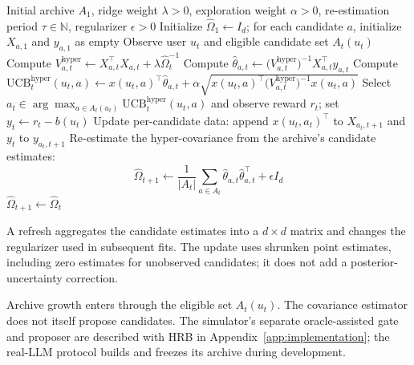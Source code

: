 \documentclass{article} %
\begin{document}
\begin{algorithm}[t]
\caption{HyperRidge-Periodic (HRP): routing with periodic covariance updates}
\label{alg:hyper-ridge}
\begin{algorithmic}[1]
\Require Initial archive $A_1$, ridge weight $\lambda > 0$, exploration
  weight $\alpha > 0$, re-estimation period $\tau \in \mathbb{N}$,
  regularizer $\epsilon > 0$
\State Initialize $\widehat{\Omega}_1 \gets I_d$; for each candidate $a$,
  initialize $X_{a,1}$ and $y_{a,1}$ as empty
  \State Observe user $u_t$ and eligible candidate set $A_t(u_t)$
    \State Compute
      $V_{a,t}^{\mathrm{hyper}} \gets X_{a,t}^\top X_{a,t}
        + \lambda \widehat{\Omega}_t^{-1}$
    \State Compute
      $\widehat{\theta}_{a,t} \gets
        \bigl( V_{a,t}^{\mathrm{hyper}} \bigr)^{-1}
        X_{a,t}^\top y_{a,t}$
    \State Compute
      $\mathrm{UCB}_t^{\mathrm{hyper}}(u_t, a) \gets
        x(u_t, a)^\top \widehat{\theta}_{a,t}
        + \alpha \sqrt{ x(u_t, a)^\top
          \bigl( V_{a,t}^{\mathrm{hyper}} \bigr)^{-1} x(u_t, a) }$
  \EndFor
  \State Select
    $a_t \in \arg\max_{a \in A_t(u_t)} \mathrm{UCB}_t^{\mathrm{hyper}}(u_t, a)$
    and observe reward $r_t$; set $y_t\gets r_t-b(u_t)$
  \State Update per-candidate data: append $x(u_t, a_t)^\top$ to
    $X_{a_t, t+1}$ and $y_t$ to $y_{a_t, t+1}$
    \State Re-estimate the hyper-covariance from the archive's
      candidate estimates:
      \begin{equation}
        \widehat{\Omega}_{t+1} \gets
          \frac{1}{|A_t|} \sum_{a \in A_t}
          \widehat{\theta}_{a,t} \widehat{\theta}_{a,t}^\top
          + \epsilon I_d
      \end{equation}
  \Else
    \State $\widehat{\Omega}_{t+1} \gets \widehat{\Omega}_t$
  \EndIf
\EndFor
\end{algorithmic}
\end{algorithm}

A refresh aggregates the candidate estimates into a $d\times d$ matrix and
changes the regularizer used in subsequent fits. The update uses shrunken
point estimates, including zero estimates for unobserved candidates; it does
not add a posterior-uncertainty correction.

Archive growth enters through the eligible set $A_t(u_t)$. The covariance
estimator does not itself propose candidates. The simulator's separate
oracle-assisted gate and proposer are described with HRB in
Appendix~\ref{app:implementation}; the real-LLM protocol builds and freezes
its archive during development.
\end{document}
